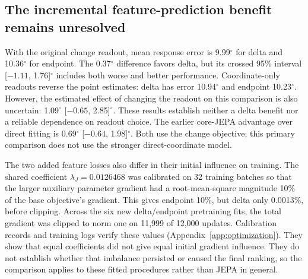 \documentclass{article}
\newcommand{\dg}{^{\circ}}
\begin{document}
\begin{table}[t]\centering\small
\caption{Exploratory response errors by observation and nominal edit, in degrees. Direct uses coordinate supervision and joint fitting; endpoint and delta use frozen encoders with the original change readout. All groups contain the same 14 people and three seeds. The last column is a paired zero-minus-direct effect with crossed 95\% interval; positive favors direct. Original 720$\dg$ failure scoring is retained.}
\label{tab:strata}
\setlength{\tabcolsep}{3.5pt}
\end{table}

\subsection{The incremental feature-prediction benefit remains unresolved}
\label{sec:feature}
With the original change readout, mean response error is 9.99$\dg$ for delta and 10.36$\dg$ for endpoint. The 0.37$\dg$ difference favors delta, but its crossed 95\% interval [$-1.11$, 1.76]$\dg$ includes both worse and better performance. Coordinate-only readouts reverse the point estimates: delta has error 10.94$\dg$ and endpoint 10.23$\dg$. However, the estimated effect of changing the readout on this comparison is also uncertain: 1.09$\dg$ [$-0.65$, 2.85]$\dg$. These results establish neither a delta benefit nor a reliable dependence on readout choice. The earlier core-JEPA advantage over direct fitting is 0.69$\dg$ [$-0.64$, 1.98]$\dg$. Both use the change objective; this primary comparison does not use the stronger direct-coordinate model.

The two added feature losses also differ in their initial influence on training. The shared coefficient $\lambda_J=0.0126468$ was calibrated on 32 training batches so that the larger auxiliary parameter gradient had a root-mean-square magnitude 10\% of the base objective's gradient. This gives endpoint 10\%, but delta only 0.0013\%, before clipping. Across the six new delta/endpoint pretraining fits, the total gradient was clipped to norm one on 11,999 of 12,000 updates. Calibration records and training logs verify these values (Appendix~\ref{app:optimization}). They show that equal coefficients did not give equal initial gradient influence. They do not establish whether that imbalance persisted or caused the final ranking, so the comparison applies to these fitted procedures rather than JEPA in general.
\end{document}
